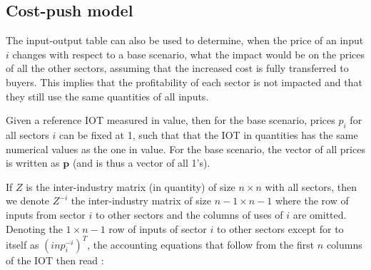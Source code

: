\documentclass[12pt,english]{article}
\newcommand{\mli}[1]{\mathit{#1}}
\newcommand\lies[2][]{\todo[color=orange!50,#1]{ldf: #2}}
\newcommand\li[1]{\lies[inline]{#1}}
\begin{document}
%
%
%
%

\subsection{Cost-push model}

\li{Check notation}The input-output table can also be used to determine, when the price of an input $i$ changes with respect to a base scenario, what the impact would be on the prices of all the other sectors, assuming that the increased cost is fully transferred to buyers. This implies that the profitability of each sector is not impacted and that they still use the same quantities of all inputs. 

Given a reference IOT measured in value, then for the base scenario, prices $p_i$ for all sectors $i$ can be fixed at 1, such that that the IOT in quantities has the same numerical values as the one in value. For the base scenario, the vector of all prices is written as $\boldsymbol{p}$ (and is thus a vector of all 1's).

If $Z$ is the inter-industry matrix (in quantity) of size $n\times n$ with all sectors, then we denote $Z^{-i}$ the inter-industry matrix of size $n-1 \times n-1$ where the row of inputs from sector $i$ to other sectors and the columns of uses of $i$ are omitted. Denoting the $1 \times n-1$ row of inputs of sector $i$ to other sectors except for to itself as $(inp^{-i}_i)^T$, the accounting equations that follow from the first $n$ columns of the IOT then read :
\end{document}
